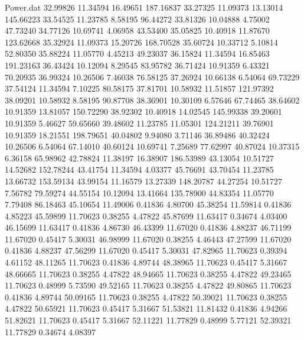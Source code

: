 \begin{filecontents}{Power.dat}
  32.99826   11.34594   16.49651  187.16837
  33.27325   11.09373   13.13014  145.66223
  33.54525   11.23785    8.58195   96.44272
  33.81326   10.04888    4.75002   47.73240
  34.77126   10.69741    4.06958   43.53400
  35.05825   10.40918   11.87670  123.62668
  35.32924   11.09373   15.20726  168.70528
  35.60724   10.33712    5.10814   52.80350
  35.88224   11.05770    4.45213   49.23037
  36.15824   11.34594   16.85463  191.23163
  36.43424   10.12094    8.29545   83.95782
  36.71424   10.91359    6.43321   70.20935
  36.99324   10.26506    7.46038   76.58125
  37.26924   10.66138    6.54064   69.73229
  37.54124   11.34594    7.10225   80.58175
  37.81701   10.58932   11.51857  121.97392
  38.09201   10.58932    8.58195   90.87708
  38.36901   10.30109    6.57646   67.74465
  38.64602   10.91359   13.81057  150.72290
  38.92302   10.40918   14.02545  145.99338
  39.20601   10.91359    5.46627   59.65660
  39.48602   11.23785   11.05301  124.21211
  39.76901   10.91359   18.21551  198.79651
  40.04802    9.94080    3.71146   36.89486
  40.32424   10.26506    6.54064   67.14010
  40.60124   10.69741    7.25689   77.62997
  40.87024   10.37315    6.36158   65.98962
  42.78824   11.38197   16.38907  186.53989
  43.13054   10.51727   14.52682  152.78244
  43.41754   11.34594    4.03377   45.76691
  43.70454   11.23785   13.66732  153.59134
  43.99154   11.16579   13.27339  148.20787
  44.27254   10.51727    7.56782   79.59274
  44.55154   10.12094   13.41664  135.78900
  44.83354   11.05770    7.79408   86.18463
  45.10654   11.49006    0.41836    4.80700
  45.38254   11.59814    0.41836    4.85223
  45.59899   11.70623    0.38255    4.47822
  45.87699   11.63417    0.34674    4.03400
  46.15699   11.63417    0.41836    4.86730
  46.43399   11.67020    0.41836    4.88237
  46.71199   11.67020    0.45417    5.30031
  46.98999   11.67020    0.38255    4.46443
  47.27599   11.67020    0.41836    4.88237
  47.56299   11.67020    0.45417    5.30031
  47.82965   11.70623    0.39394    4.61152
  48.11265   11.70623    0.41836    4.89744
  48.38965   11.70623    0.45417    5.31667
  48.66665   11.70623    0.38255    4.47822
  48.94665   11.70623    0.38255    4.47822
  49.23465   11.70623    0.48999    5.73590
  49.52165   11.70623    0.38255    4.47822
  49.80865   11.70623    0.41836    4.89744
  50.09165   11.70623    0.38255    4.47822
  50.39021   11.70623    0.38255    4.47822
  50.65921   11.70623    0.45417    5.31667
  51.53821   11.81432    0.41836    4.94266
  51.82621   11.70623    0.45417    5.31667
  52.11221   11.77829    0.48999    5.77121
  52.39321   11.77829    0.34674    4.08397

\end{filecontents}

